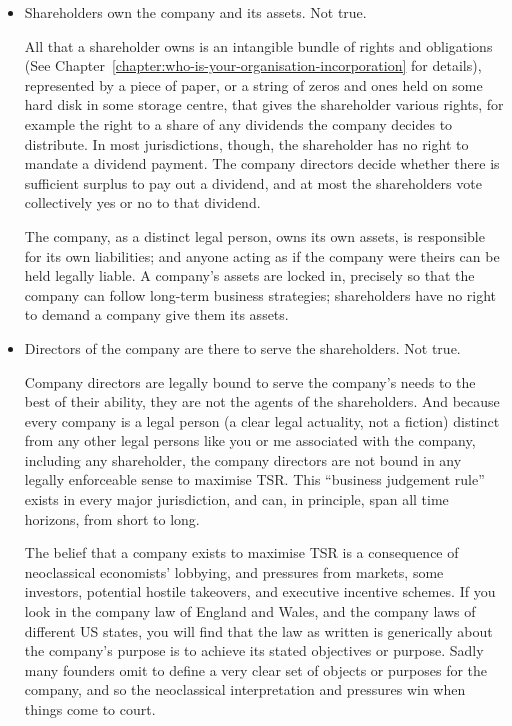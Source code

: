 \begin{itemize}
\item Shareholders own the company and its assets. Not true.


All that a shareholder owns is an intangible bundle of rights and obligations\cite{brown-bbaequity} (See Chapter~\ref{chapter:who-is-your-organisation-incorporation} for details), represented by a piece of paper, or a string of zeros and ones held on some hard disk in some storage centre, that gives the shareholder various rights, for example the right to a share of any dividends the company decides to distribute. In most jurisdictions, though, the shareholder has no right to mandate a dividend payment. The company directors decide whether there is sufficient surplus to pay out a dividend, and at most the shareholders vote collectively yes or no to that dividend.


The company, as a distinct legal person, owns its own assets, is responsible for its own liabilities; and anyone acting as if the company were theirs can be held legally liable. A company’s assets are locked in, precisely so that the company can follow long-term business strategies; shareholders have no right to demand a company give them its assets.


\item Directors of the company are there to serve the shareholders. Not true.


Company directors are legally bound to serve the company’s needs to the best of their ability, they are not the agents of the shareholders. And because every company is a legal person (a clear legal actuality, not a fiction) distinct from any other legal persons like you or me associated with the company, including any shareholder, the company directors are not bound in any legally enforceable sense to maximise TSR. This “business judgement rule” exists in every major jurisdiction, and can, in principle, span all time horizons, from short to long. 


The belief that a company exists to maximise TSR is a consequence of neoclassical economists’ lobbying, and pressures from markets, some investors, potential hostile takeovers, and executive incentive schemes. If you look in the company law of England and Wales, and the company laws of different US states, you will find that the law as written is generically about the company’s purpose is to achieve its stated objectives or purpose. Sadly many founders omit to define a very clear set of objects or purposes for the company, and so the neoclassical interpretation and pressures win when things come to court.



\end{itemize}
